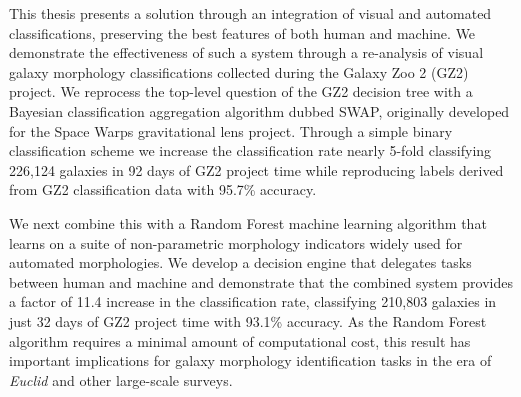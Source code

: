 This thesis presents a solution through an integration of visual and automated classifications, preserving the best features of both human and machine. We demonstrate the effectiveness of such a system through a re-analysis of visual galaxy morphology classifications collected during the Galaxy Zoo 2 (GZ2) project. We reprocess the top-level question of the GZ2 decision tree with a Bayesian classification aggregation algorithm dubbed SWAP, originally developed for the Space Warps gravitational lens project. Through a simple binary classification scheme we increase the classification rate nearly 5-fold classifying 226,124 galaxies in 92 days of GZ2 project time while reproducing labels derived from GZ2 classification data with 95.7\% accuracy.

We next combine this with a Random Forest machine learning algorithm that learns on a suite of non-parametric morphology indicators widely used for automated morphologies. We develop a decision engine that delegates tasks between human and machine and demonstrate that the combined system provides a factor of 11.4 increase in the classification rate, classifying 
210,803 galaxies in just 32 days of GZ2 project time with 93.1\% accuracy. As the Random Forest algorithm requires a minimal amount of computational cost, this result has
important implications for galaxy morphology identification tasks in the 
era of \textit{Euclid} and other large-scale surveys.











